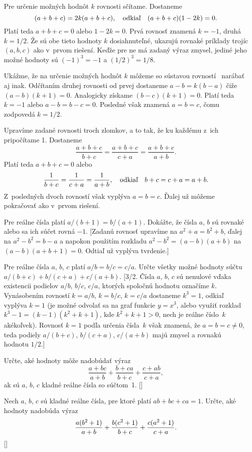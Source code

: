 {Pre určenie možných hodnôt $k$ rovnosti  sčítame. Dostaneme
$$
(a+b+c)=2k(a+b+c),\quad\hbox{odkiaľ}\quad (a+b+c)(1-2k)=0.
$$
Platí teda $a+b+c=0$ alebo $1-2k=0$. Prvá rovnosť znamená
$k={-1}$, druhá $k=1/2$. Že sú obe tieto hodnoty $k$ dosiahnuteľné,
ukazujú rovnaké príklady trojíc $(a,b,c)$ ako v~prvom riešení.
Keďže pre ne má zadaný výraz zmysel, jediné jeho možné hodnoty
sú $({-1})^3={-1}$ a $(1/2)^3=1/8$.

\poznamka
Ukážme, že na určenie možných hodnôt $k$ môžeme so sústavou rovností~
narábať aj inak. Odčítaním druhej rovnosti od prvej dostaneme $a-b=k(b-a)$
čiže $(a-b)(k+1)=0$. Analogicky získame $(b-c)(k+1)=0$.
Platí teda $k={-1}$ alebo $a-b=b-c=0$. Posledné však znamená
$a=b=c$, čomu zodpovedá $k=1/2$.

\ineriesenie
Upravíme zadané rovnosti troch zlomkov, a to tak, že ku každému
z~ich pripočítame 1. Dostaneme
$$
\frac{a+b+c}{b+c}=\frac{a+b+c}{c+a}=\frac{a+b+c}{a+b}.
$$
Platí teda $a+b+c=0$ alebo
$$
\frac{1}{b+c}=\frac{1}{c+a}=\frac{1}{a+b},\quad\hbox{odkiaľ}
\quad b+c=c+a=a+b.
$$
Z~posledných dvoch rovností však vyplýva $a=b=c$. Ďalej už môžeme
pokračovať ako v~prvom riešení.

Pre reálne čísla platí $a/(b+1)=b/(a+1)$.
Dokážte, že čísla $a$, $b$ sú rovnaké
alebo sa ich súčet rovná ${-1}$.
[Zadanú rovnosť upravíme na $a^2+a=b^2+b$, ďalej na
$a^2-b^2=b-a$ a napokon použitím rozkladu $a^2-b^2=(a-b)(a+b)$ na
$(a-b)(a+b+1)=0$. Odtiaľ už vyplýva tvrdenie.]

Pre reálne čísla $a$, $b$, $c$ platí $a/b=b/c=c/a$.
Určte všetky možné hodnoty súčtu $a/(b+c)+b/(c+a)+c/(a+b)$.
[3/2. Čísla $a$, $b$, $c$ sú nenulové vďaka existencii podielov
$a/b$, $b/c$, $c/a$, ktorých spoločnú hodnotu označíme $k$.
Vynásobením rovností $k=a/b$, $k=b/c$, $k=c/a$ dostaneme
$k^3=1$, odkiaľ vyplýva $k=1$ (je možné odvolať sa na graf funkcie
$y=x^3$, alebo využiť rozklad $k^3-1=(k-1)(k^2+k+1)$, kde
$k^2+k+1>0$, nech je reálne číslo~$k$ akékoľvek). Rovnosť $k=1$
podľa určenia čísla~$k$ však znamená, že $a=b=c\ne0$, teda
podiely $a/(b+c)$, $b/(c+a)$, $c/(a+b)$ majú zmysel a rovnakú
hodnotu $1/2$.]

\D
Určte, aké hodnoty môže nadobúdať výraz
$$\frac{a+bc}{a+b}+\frac{b+ca}{b+c}+\frac{c+ab}{c+a},$$
ak sú $a$, $b$, $c$ kladné reálne čísla so súčtom~1.
[]

Nech $a$, $b$, $c$ sú kladné reálne čísla, pre ktoré platí $ab+bc+ca=1$.
Určte, aké hodnoty nadobúda výraz
{
$$
\frac{a(b^2+1)}{a+b}+\frac{b(c^2+1)}{b+c}+\frac{c(a^2+1)}{c+a}\vadjust{\nobreak}.
$$}
[]

}
